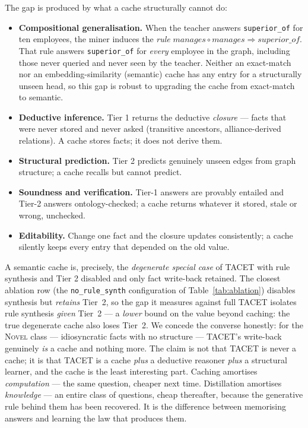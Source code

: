 \documentclass[11pt]{article}
\theoremstyle{plain}
\begin{document}
The gap is produced by what a cache structurally cannot do:
\begin{itemize}
\item \textbf{Compositional generalisation.} When the teacher answers
\texttt{superior\_of} for ten employees, the miner induces the \emph{rule}
$\mathit{manages}\circ\mathit{manages}\Rightarrow\mathit{superior\_of}$.
That rule answers \texttt{superior\_of} for \emph{every} employee in the
graph, including those never queried and never seen by the teacher. Neither
an exact-match nor an embedding-similarity (semantic) cache has any entry
for a structurally unseen head, so this gap is robust to upgrading the
cache from exact-match to semantic.
\item \textbf{Deductive inference.} Tier 1 returns the deductive
\emph{closure} --- facts that were never stored and never asked
(transitive ancestors, alliance-derived relations). A cache stores facts;
it does not derive them.
\item \textbf{Structural prediction.} Tier 2 predicts genuinely unseen
edges from graph structure; a cache recalls but cannot predict.
\item \textbf{Soundness and verification.} Tier-1 answers are provably
entailed and Tier-2 answers ontology-checked; a cache returns whatever it
stored, stale or wrong, unchecked.
\item \textbf{Editability.} Change one fact and the closure updates
consistently; a cache silently keeps every entry that depended on the old
value.
\end{itemize}

A semantic cache is, precisely, the \emph{degenerate special case} of
TACET with rule synthesis and Tier 2 disabled and only fact write-back
retained. The closest ablation row (the \texttt{no\_rule\_synth}
configuration of Table~\ref{tab:ablation}) disables synthesis but
\emph{retains} Tier~2, so the gap it measures against full TACET isolates
rule synthesis \emph{given} Tier~2 --- a \emph{lower} bound on the value
beyond caching: the true degenerate cache also loses Tier~2. We concede the converse honestly: for the \textsc{Novel} class ---
idiosyncratic facts with no structure --- TACET's write-back genuinely
\emph{is} a cache and nothing more. The claim is not that TACET is never
a cache; it is that TACET is a cache \emph{plus} a deductive reasoner
\emph{plus} a structural learner, and the cache is the least interesting
part. Caching amortises \emph{computation} --- the same question, cheaper
next time. Distillation amortises \emph{knowledge} --- an entire class of
questions, cheap thereafter, because the generative rule behind them has
been recovered. It is the difference between memorising answers and
learning the law that produces them.
\end{document}
